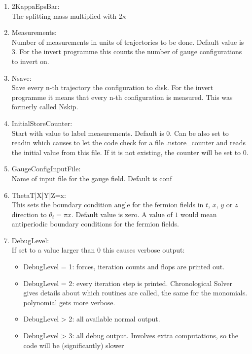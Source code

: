 \begin{enumerate}
\item {\ttfamily 2KappaEpsBar}:\\
  The splitting mass multiplied with $2\kappa$

\item {\ttfamily Measurements}:\\
  Number of measurements in units of trajectories to be done. Default
  value is $3$. For the {\ttfamily invert} programme this counts the
  number of gauge configurations to invert on.

\item {\ttfamily Nsave}:\\
  Save every n-th trajectory the configuration to disk.
  For the {\ttfamily invert} programme it means that every n-th
  configuration is measured. This was formerly called {\ttfamily
    Nskip}.

\item {\ttfamily InitialStoreCounter}:\\
  Start with value to label measurements. Default is $0$. Can be also
  set to {\ttfamily readin} which causes to let the code check for a
  file {\ttfamily .nstore\_counter} and reads the initial value from
  this file. If it is not existing, the counter will be set to $0$.

\item {\ttfamily GaugeConfigInputFile}:\\
  Name of input file for the gauge field. Default is {\ttfamily conf}

\item {\ttfamily ThetaT|X|Y|Z=x}:\\
  This sets the boundary condition angle for the fermion fields in
  $t$, $x$, $y$ or $z$ direction to $\theta_t = \pi x$. Default value is
  zero. A value of $1$ would mean antiperiodic boundary conditions
  for the fermion fields.

\item {\ttfamily DebugLevel}:\\
  If set to a value larger than $0$ this causes verbose output:
  \begin{itemize}
  \item {\ttfamily DebugLevel = 1}: forces, iteration counts and flops are printed out.
  \item {\ttfamily DebugLevel = 2}: every iteration step is
    printed. Chronological Solver gives details about which routines
    are called, the same for the monomials. polynomial gets more verbose.
  \item {\ttfamily DebugLevel > 2}: all available normal output.
  \item {\ttfamily DebugLevel > 3}: all debug output. Involves extra
    computations, so the code will be (significantly) slower
  \end{itemize}


\end{enumerate}
